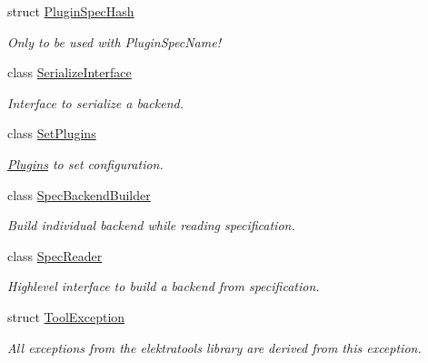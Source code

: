 \begin{DoxyCompactItemize}
struct \hyperlink{structkdb_1_1tools_1_1PluginSpecHash}{Plugin\+Spec\+Hash}
\begin{DoxyCompactList}\small\item\em Only to be used with Plugin\+Spec\+Name! \end{DoxyCompactList}\item 
class \hyperlink{classkdb_1_1tools_1_1SerializeInterface}{Serialize\+Interface}
\begin{DoxyCompactList}\small\item\em Interface to serialize a backend. \end{DoxyCompactList}\item 
class \hyperlink{classkdb_1_1tools_1_1SetPlugins}{Set\+Plugins}
\begin{DoxyCompactList}\small\item\em \hyperlink{classkdb_1_1tools_1_1Plugins}{Plugins} to set configuration. \end{DoxyCompactList}\item 
class \hyperlink{classkdb_1_1tools_1_1SpecBackendBuilder}{Spec\+Backend\+Builder}
\begin{DoxyCompactList}\small\item\em Build individual backend while reading specification. \end{DoxyCompactList}\item 
class \hyperlink{classkdb_1_1tools_1_1SpecReader}{Spec\+Reader}
\begin{DoxyCompactList}\small\item\em Highlevel interface to build a backend from specification. \end{DoxyCompactList}\item 
struct \hyperlink{structkdb_1_1tools_1_1ToolException}{Tool\+Exception}
\begin{DoxyCompactList}\small\item\em All exceptions from the elektratools library are derived from this exception. \end{DoxyCompactList}\end{DoxyCompactItemize}
